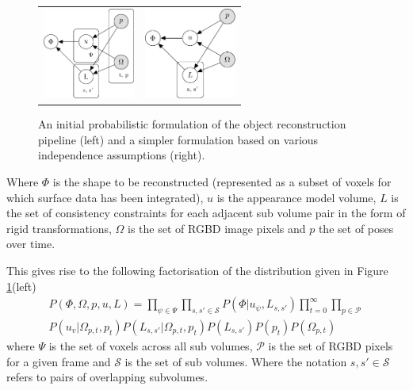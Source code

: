 \begin{figure}[!t]
	\centering
	\begin{tabular}{cc}
		\includegraphics[height=3cm]{graphical_models/pgm1.pdf}&
		\includegraphics[height=3cm]{graphical_models/pgm2.pdf}
		\vspace{-3mm}
	\end{tabular}
	\caption{An initial probabilistic formulation of the object reconstruction pipeline (left) and a simpler formulation based on various independence assumptions (right).}
	\label{fig:pgm}
\end{figure}

Where $\Phi$ is the shape to be reconstructed (represented as a subset of voxels for which surface data has been integrated), $u$ is the appearance model volume, $L$ is the 
set of consistency constraints for each adjacent sub volume pair in the form of rigid transformations, $\Omega$ is the set of 
RGBD image pixels and $p$ the set of poses over time.

This gives rise to the following factorisation of the distribution given in Figure \ref{fig:pgm}(left)
\begin{equation}
\begin{split}
P(\Phi, \Omega, p, u, L) = 
\prod_{\psi \in \Psi}\prod_{s, s' \in \mathcal{S}}P(\Phi|u_{\psi}, L_{s, s'}) 
\prod_{t=0}^{\infty}\prod_{p \in \mathcal{P}}\\
P(u_{v}|\Omega_{p, t}, p_{t})
P(L_{s, s'}|\Omega_{p, t}, p_{t})
P(L_{s, s'})P(p_{t})P(\Omega_{p, t})
\end{split}
\end{equation}
where $\Psi$ is the set of voxels across all sub volumes, $\mathcal{P}$ is the set of RGBD pixels for a given 
frame and $\mathcal{S}$ is the set of sub volumes. Where the notation $s, s' \in \mathcal{S}$ refers to pairs of overlapping subvolumes.

